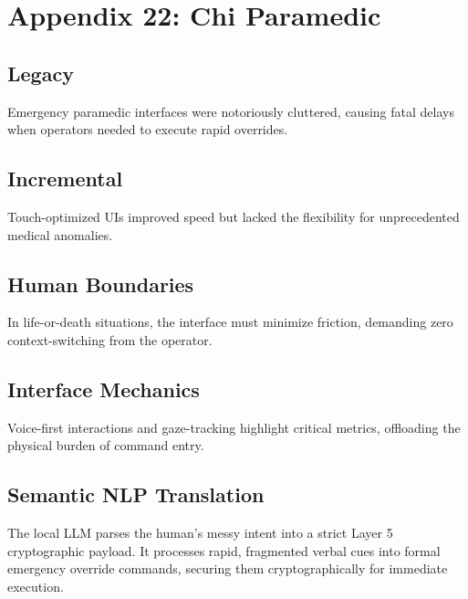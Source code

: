 \chapter{Appendix 22: Chi Paramedic}

\section{Legacy}
Emergency paramedic interfaces were notoriously cluttered, causing fatal delays when operators needed to execute rapid overrides.

\section{Incremental}
Touch-optimized UIs improved speed but lacked the flexibility for unprecedented medical anomalies.

\section{Human Boundaries}
In life-or-death situations, the interface must minimize friction, demanding zero context-switching from the operator.

\section{Interface Mechanics}
Voice-first interactions and gaze-tracking highlight critical metrics, offloading the physical burden of command entry.

\section{Semantic NLP Translation}
The local LLM parses the human's messy intent into a strict Layer 5 cryptographic payload. It processes rapid, fragmented verbal cues into formal emergency override commands, securing them cryptographically for immediate execution.
